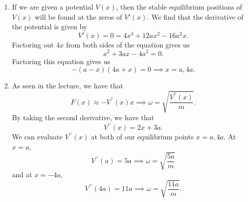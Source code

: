 \begin{sol}
\begin{enumerate}[label=\textbf{(\alph*)}] 
\item If we are given a potential $V(x)$, then the stable equilibrium positions of $V(x)$ will be found at the zeros of $V'(x)$. We find that the derivative of the potential is given by 
\[V'(x) = 0 = 4x^3 + 12ax^2 - 16a^2 x.\]
Factoring out $4x$ from both sides of the equation gives us 
\[x^2 + 3ax - 4a^2 = 0.\]
Factoring this equation gives us 
\[-(a-x)(4a + x) = 0\implies x = a, 4a.\]

\item As seen in the lecture, we have that 
\[F(x) \approx -V^{''}(x) x\implies \omega = \sqrt{\frac{V^{''}(x)}{m}}.\]
By taking the second derivative, we have that 
\[V^{\prime \prime} (x) = 2x + 3a.\]
We can evaluate $V^{\prime \prime} (x)$ at both of our equilibrium points $x = a, 4a$. At $x=a$, 
\[V^{\prime \prime} (a) = 5a\implies \omega = \sqrt{\frac{5a}{m}}\]
and at $x = -4a$, 
\[V^{\prime \prime} (4a) = 11a\implies \omega = \sqrt{\frac{11a}{m}}.\]
\end{enumerate}
\end{sol}